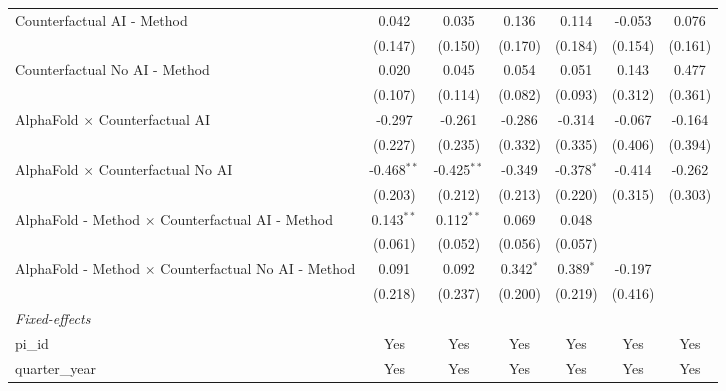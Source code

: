 \begin{tabular}{lcccccc}
   Counterfactual AI - Method                                 & 0.042         & 0.035         & 0.136        & 0.114         & -0.053  & 0.076\\   
                                                              & (0.147)       & (0.150)       & (0.170)      & (0.184)       & (0.154) & (0.161)\\   
   Counterfactual No AI - Method                              & 0.020         & 0.045         & 0.054        & 0.051         & 0.143   & 0.477\\   
                                                              & (0.107)       & (0.114)       & (0.082)      & (0.093)       & (0.312) & (0.361)\\   
   AlphaFold $\times$ Counterfactual AI                       & -0.297        & -0.261        & -0.286       & -0.314        & -0.067  & -0.164\\   
                                                              & (0.227)       & (0.235)       & (0.332)      & (0.335)       & (0.406) & (0.394)\\   
   AlphaFold $\times$ Counterfactual No AI                    & -0.468$^{**}$ & -0.425$^{**}$ & -0.349       & -0.378$^{*}$  & -0.414  & -0.262\\   
                                                              & (0.203)       & (0.212)       & (0.213)      & (0.220)       & (0.315) & (0.303)\\   
   AlphaFold - Method $\times$ Counterfactual AI - Method     & 0.143$^{**}$  & 0.112$^{**}$  & 0.069        & 0.048         &         &   \\   
                                                              & (0.061)       & (0.052)       & (0.056)      & (0.057)       &         &   \\   
   AlphaFold - Method $\times$ Counterfactual No AI - Method  & 0.091         & 0.092         & 0.342$^{*}$  & 0.389$^{*}$   & -0.197  &   \\   
                                                              & (0.218)       & (0.237)       & (0.200)      & (0.219)       & (0.416) &   \\   
   \midrule
   \emph{Fixed-effects}\\
   pi\_id                                                     & Yes           & Yes           & Yes          & Yes           & Yes     & Yes\\  
   quarter\_year                                              & Yes           & Yes           & Yes          & Yes           & Yes     & Yes\\  

\end{tabular}
